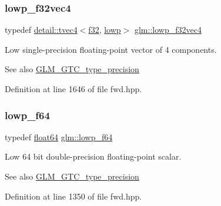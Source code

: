 \subsubsection{\texorpdfstring{lowp\+\_\+f32vec4}{lowp\_f32vec4}}
{\footnotesize\ttfamily typedef \hyperlink{structglm_1_1detail_1_1tvec4}{detail\+::tvec4}$<$\hyperlink{group__gtc__type__precision_ga0ec999b57f5330d9021256e96038df04}{f32}, \hyperlink{namespaceglm_a0f04f086094c747d227af4425893f545ae161af3fc695e696ce3bf69f7332bc2d}{lowp}$>$ \hyperlink{group__gtc__type__precision_ga59f7292d7ed0b7df72e6aa31010e2648}{glm\+::lowp\+\_\+f32vec4}}

Low single-\/precision floating-\/point vector of 4 components. \begin{DoxySeeAlso}{See also}
\hyperlink{group__gtc__type__precision}{G\+L\+M\+\_\+\+G\+T\+C\+\_\+type\+\_\+precision} 
\end{DoxySeeAlso}


Definition at line 1646 of file fwd.\+hpp.

\mbox{\label{group__gtc__type__precision_ga59839f4bf6b97c93b0def577890bbfb8}} 
\subsubsection{\texorpdfstring{lowp\+\_\+f64}{lowp\_f64}}
{\footnotesize\ttfamily typedef \hyperlink{group__gtc__type__precision_gab721f828b41f46b20cf4883b50733d3b}{float64} \hyperlink{group__gtc__type__precision_ga59839f4bf6b97c93b0def577890bbfb8}{glm\+::lowp\+\_\+f64}}

Low 64 bit double-\/precision floating-\/point scalar. \begin{DoxySeeAlso}{See also}
\hyperlink{group__gtc__type__precision}{G\+L\+M\+\_\+\+G\+T\+C\+\_\+type\+\_\+precision} 
\end{DoxySeeAlso}


Definition at line 1350 of file fwd.\+hpp.

\mbox{\label{group__gtc__type__precision_ga2984b3b0b6ee0657044d186bb875b4e3}} 
